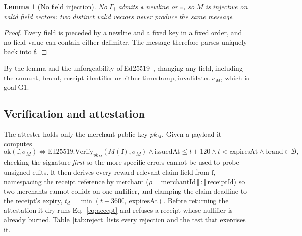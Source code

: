 \documentclass[10.5pt,letterpaper]{article}
\newtheorem{lemma}{Lemma}
\theoremstyle{definition}
\theoremstyle{remark}
\begin{document}
\begin{lemma}[No field injection]
No $\Gamma_i$ admits a newline or \texttt{=}, so $M$ is injective on valid field vectors: two distinct valid vectors
never produce the same message.
\end{lemma}
\begin{proof}
Every field is preceded by a newline and a fixed key in a fixed order, and no field value can contain either
delimiter. The message therefore parses uniquely back into $\mathbf f$.
\end{proof}

By the lemma and the unforgeability of Ed25519~\cite{rfc8032}, changing any field, including the amount, brand, receipt
identifier or either timestamp, invalidates $\sigma_M$, which is goal G1.

\subsection{Verification and attestation}
The attester holds only the merchant public key $pk_M$. Given a payload it computes
\begin{equation}\label{eq:mverify}
\mathrm{ok}(\mathbf f,\sigma_M) \iff \mathrm{Ed25519.Verify}_{pk_M}(M(\mathbf f),\sigma_M) \wedge \text{issuedAt}\le t+120 \wedge t<\text{expiresAt} \wedge \text{brand}\in\mathcal B,
\end{equation}
checking the signature \emph{first} so the more specific errors cannot be used to probe unsigned edits. It then derives
every reward-relevant claim field from $\mathbf f$, namespacing the receipt reference by merchant
($\rho = \text{merchantId}\,\Vert\,\texttt{:}\,\Vert\,\text{receiptId}$) so two merchants cannot collide on one nullifier, and
clamping the claim deadline to the receipt's expiry, $t_d=\min(t+3600,\ \text{expiresAt})$. Before returning the
attestation it dry-runs Eq.~\ref{eq:accept} and refuses a receipt whose nullifier is already burned. Table~\ref{tab:reject}
lists every rejection and the test that exercises it.
\end{document}
